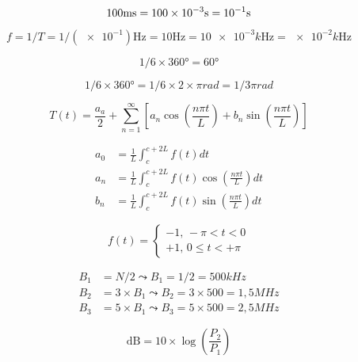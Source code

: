 \documentclass{minimal}
\begin{document}
\begin{equation*}
100 \unit{ms} = \num{100e-3} \unit{s} = \num{e-1} \unit{s} \\
\end{equation*}

\begin{equation*}
  f = 1/T = 1/(\num{e-1})\unit{\hertz} = 10 \unit{\hertz} = \num{10e-3} k\unit{\hertz}  = \num{e-2} k\unit{\hertz}
\end{equation*}

\begin{equation*}
 1/6 \times \ang{360} = \ang{60}
\end{equation*}

\begin{equation*}
 1/6 \times \ang{360} = 1/6 \times 2 \times \pi \unit{rad} = 1 / 3 \pi \unit{rad}
\end{equation*}

\begin{equation*}
  T(t) = \frac{a_a}{2} + \sum_{n=1}^{\infty}\left[{a_n \cos\left(\frac{n\pi t}{L}\right) + b_n \sin\left(\frac{n\pi t}{L}\right)}\right]
\end{equation*}

\begin{align*}
  a_0 &= \frac{1}{L}\int_{c}^{c + 2L}f(t) dt \\
  a_n &= \frac{1}{L}\int_{c}^{c + 2L}f(t)\cos\left(\frac{n\pi t}{L}\right) dt \\
  b_n &= \frac{1}{L}\int_{c}^{c + 2L}f(t)\sin\left(\frac{n\pi t}{L}\right) dt
\end{align*}

\begin{equation*}
  f(t) =
  \begin{cases}
    -1,\,-\pi < t < 0 \\
    +1,\, 0 \le t < +\pi
  \end{cases}
\end{equation*}

\begin{align*}
B_1 &= N / 2 \leadsto B_1 = 1 / 2 = 500\unit{kHz} \\
B_2 &= 3 \times B_1 \leadsto B_2 = 3 \times 500 = 1,5\unit{MHz} \\
B_3 &= 5 \times B_1 \leadsto B_3 = 5 \times 500 = 2,5\unit{MHz}
\end{align*}

\begin{equation*}
  \text{dB} = 10 \times \log\left({\frac{P_2}{P_1}}\right)
\end{equation*}
\end{document}
